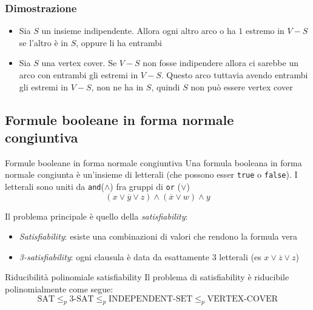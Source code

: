 \subsubsection{Dimostrazione}
\begin{itemize}
	\item Sia $ S $ un insieme indipendente. Allora ogni altro arco o ha $ 1 $ estremo in $ V-S $ se l'altro è in $ S $, oppure li ha entrambi
	\item Sia $ S $ una vertex cover. Se $ V-S $ non fosse indipendere allora ci sarebbe un arco con entrambi gli estremi in $ V-S $. Questo arco tuttavia avendo entrambi gli estremi in $ V-S $, non ne ha in $ S $, quindi $ S $ non può essere vertex cover
\end{itemize}
\subsection{Formule booleane in forma normale congiuntiva}
\begin{definizione}{Formule booleane in forma normale congiuntiva}
	Una formula booleana in forma normale congiunta è un'insieme di letterali (che possono esser \verb|true| o \verb|false|). I letterali sono uniti da \verb|and|($ \land $) fra gruppi di \verb|or| ($ \lor $)
	\[
		(x \lor \overline{y} \lor z) \land (\overline{x} \lor w) \land y
	\]
\end{definizione}
Il problema principale è quello della \textit{satisfiability}:
\begin{itemize}
	\item \textit{Satisfiability}: esiste una combinazioni di valori che rendono la formula vera
	\item \textit{3-satisfiability}: ogni clausula è data da esattamente 3  letterali (es $ x \lor \overline{z} \lor z $)
\end{itemize}\label{satisfiability}
\begin{teorema}{Riducibilità polinomiale satisfiability}
	Il problema di satisfiability è riducibile polinomialmente come segue:
	\[
		\text{SAT} \leq_p \text{3-SAT} \leq_p \text{INDEPENDENT-SET} \leq_p \text{VERTEX-COVER}
	\]
\end{teorema}

